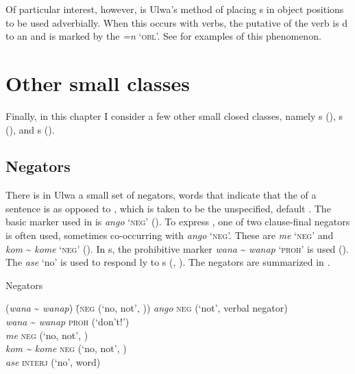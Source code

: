 Of particular interest, however, is Ulwa’s method of placing s in object positions to be used adverbially. When this occurs with  verbs, the putative  of the verb is d to an  and is marked by the  \textit{=n} ‘\textsc{obl}’. See  for examples of this phenomenon.


\section{Other small classes}\label{sec:8.3}


Finally, in this chapter I consider a few other small closed classes, namely s (), s (), and s ().

\subsection{Negators}\label{sec:8.3.1}


There is in Ulwa a small set of negators, words that indicate that the  of a sentence is  as opposed to , which is taken to be the unspecified, default . The basic  marker used in  is \textit{ango} ‘\textsc{neg}’ (). To express , one of two clause-final negators is often used, sometimes co-occurring with \textit{ango} ‘\textsc{neg}’. These are \textit{me} ‘\textsc{neg’} and \textit{kom} {\textasciitilde} \textit{kome} ‘\textsc{neg}’ (). In s, the prohibitive marker \textit{wana} {\textasciitilde} \textit{wanap} ‘\textsc{proh’} is used (). The  \textit{ase} ‘no’ is used to respond ly to s (, ). The negators are summarized in .

\ea%
    \label{ex:otherwc:147}
          Negators\\
\begin{tabbing}
{(\textit{wana} {\textasciitilde} \textit{wanap})} \= {(\textsc{neg} (‘no, not’, ))}\kill
\textit{ango} \> \textsc{neg} (‘not’, verbal negator)\\
\textit{wana} {\textasciitilde} \textit{wanap} \> \textsc{proh} (‘don’t!’)\\
\textit{me} \> \textsc{neg} (‘no, not’, )\\
\textit{kom {\textasciitilde} kome} \> \textsc{neg} (‘no, not’, )\\
\textit{ase} \> {\textsc{interj} (‘no’,  word)}
\end{tabbing}
 \z

